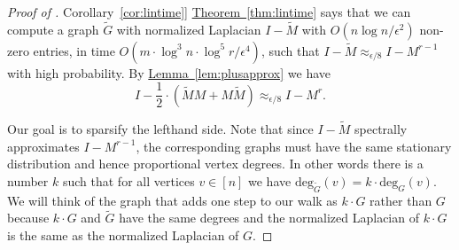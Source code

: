 \documentclass[11pt]{article}
\numberwithin{equation}{section}
\theoremstyle{definition}
\theoremstyle{plain}
\newcommand{\expref}[2]{\hyperref[#2]{#1~\ref{#2}}}
\newcommand{\wt}{\widetilde}   %
\numberwithin{myalgctr}{section}
\theoremstyle{named}
\begin{document}
\begin{proof}[Proof of \expref{Corollary}{cor:lintime}]
\expref{Theorem}{thm:lintime} says that we can compute a graph $\wt{G}$ with normalized Laplacian $I-\wt{M}$ with $O(n\log n/\epsilon^2)$ non-zero entries, in time $O(m\cdot \log^3 n\cdot \log^5 r/\epsilon^4)$, such that $I-\wt{M}\approx_{\epsilon/8}I-M^{r-1}$ with high probability. By \expref{Lemma}{lem:plusapprox} we have
\begin{equation}
\label{eq:oddtime}
I-\frac{1}{2}\cdot(\wt{M}M+M\wt{M}) \approx_{\epsilon/8} I-M^{r}.
\end{equation}

Our goal is to sparsify the lefthand side. Note that since $I-\wt{M}$ spectrally approximates $I-M^{r-1}$, the corresponding graphs must have the same stationary distribution and hence proportional vertex degrees. In other words there is a number $k$ such that for all vertices $v\in[n]$ we have $\mathrm{deg}_{\wt{G}}(v)=k\cdot\mathrm{deg}_{G}(v)$. We will think of the graph that adds one step to our walk as $k\cdot G$ rather than $G$ because $k\cdot G$ and $\wt{G}$ have the same degrees and the normalized Laplacian of $k\cdot G$ is the same as the normalized Laplacian of $G$.


\end{proof}
\end{document}
